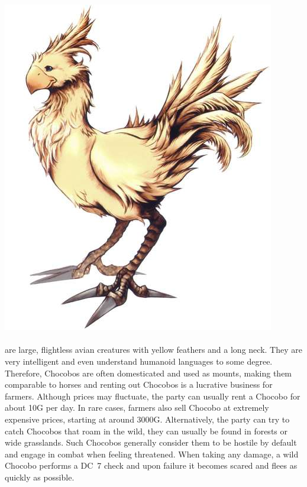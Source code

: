 %

\\\\
%
\includegraphics[width=0.95\columnwidth]{./art/chocobo/chocobo.jpg}
%
\\\\
%
%
 are large, flightless avian creatures with yellow feathers and a long neck.
They are very intelligent and even understand humanoid languages to some degree.
Therefore, Chocobos are often domesticated and used as mounts, making them comparable to horses and renting out Chocobos is a lucrative business for farmers.
Although prices may fluctuate, the party can usually rent a Chocobo for about 10G per day.
In rare cases, farmers also sell Chocobo at extremely expensive prices, starting at around 3000G. 
Alternatively, the party can try to catch Chocobos that roam in the wild, they can usually be found in forests or wide grasslands.
Such Chocobos generally consider them to be hostile by default and engage in combat when feeling threatened.
When taking any damage, a wild Chocobo performs a DC~7 check and upon failure it becomes scared and flees as quickly as possible.
